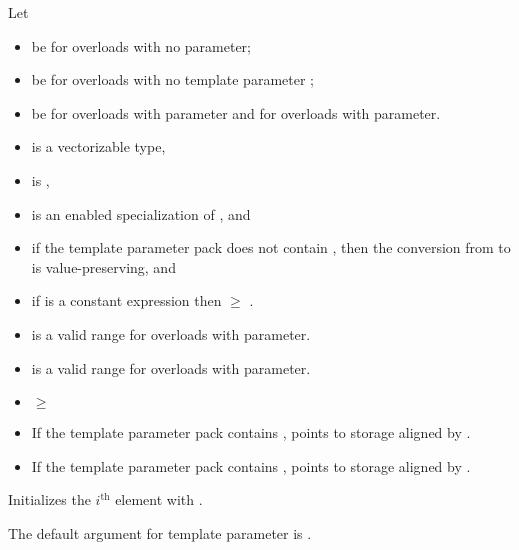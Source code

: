 \begin{itemdescr}
  \pnum
  Let
  \begin{itemize}
    \item {} be  for overloads with no  parameter;
    \item {} be  for overloads with no template parameter
      ;
    \item {} be  for overloads with  parameter and
       for overloads with  parameter.
  \end{itemize}

  \pnum\mandates
  \begin{itemize}
    \item {} is a vectorizable type,
    \item {} is ,
    \item {} is an enabled specialization of , and
    \item if the template parameter pack  does not contain \tcode{\convertflag}, then
      the conversion from  to  is
      value-preserving, and
    \item if  is a constant expression then  $\ge$
      .
  \end{itemize}

  \pnum\expects
  \begin{itemize}
    \item {} is a valid range for overloads with  parameter.
    \item {} is a valid range for overloads with  parameter.
    \item {} $\ge$ 
    \item If the template parameter pack  contains \tcode{\alignedflag},
       points to storage aligned by .
    \item If the template parameter pack  contains ,
       points to storage aligned by .
  \end{itemize}

  \pnum\effects
  Initializes the $i^\text{th}$ element with  \foralli[V::].

  \pnum\remarks
  The default argument for template parameter  is
  .
\end{itemdescr}

